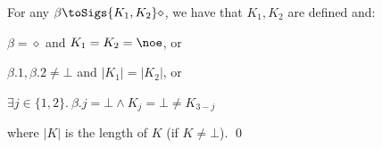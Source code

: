 \begin{lemma}\label{lem:Ks}
  For any $\beta\toSigs{K_1,K_2}\diamond$, we have that $K_1,K_2$ are defined and:
  \begin{compactitem}
    \item $\beta=\diamond$ and $K_1=K_2=\noe$, or
    \item $\beta.1,\beta.2\neq\bot$ and 
      $|K_1|=|K_2|$, or
      \item $\exists j\in\{1,2\}.\ \beta.j=\bot \land K_j=\bot\neq K_{3-j}$
\end{compactitem}
where $|K|$ is the length of $K$ (if $K\neq\bot$). \qed
\end{lemma}

